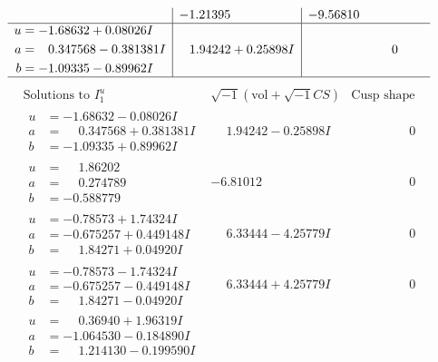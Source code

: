 \documentclass[1p]{elsarticle_modified}
\theoremstyle{definition}
\newcommand{\I}{\sqrt{-1}}
\begin{document}
$$\begin{array}{c|c|c}
 & -1.21395\phantom{ +0.000000I} & -9.56810\phantom{ +0.000000I} \\ \hline\begin{aligned}
u &= -1.68632 + 0.08026 I \\
a &= \phantom{-}0.347568 - 0.381381 I \\
b &= -1.09335 - 0.89962 I\end{aligned}
 & \phantom{-}1.94242 + 0.25898 I & \phantom{-0.000000 } 0\\
 \hline 
 \end{array}$$\newpage$$\begin{array}{c|c|c}  
\text{Solutions to }I^u_{1}& \I (\text{vol} + \sqrt{-1}CS) & \text{Cusp shape}\\
 \hline 
\begin{aligned}
u &= -1.68632 - 0.08026 I \\
a &= \phantom{-}0.347568 + 0.381381 I \\
b &= -1.09335 + 0.89962 I\end{aligned}
 & \phantom{-}1.94242 - 0.25898 I & \phantom{-0.000000 } 0 \\ \hline\begin{aligned}
u &= \phantom{-}1.86202\phantom{ +0.000000I} \\
a &= \phantom{-}0.274789\phantom{ +0.000000I} \\
b &= -0.588779\phantom{ +0.000000I}\end{aligned}
 & -6.81012\phantom{ +0.000000I} & \phantom{-0.000000 } 0 \\ \hline\begin{aligned}
u &= -0.78573 + 1.74324 I \\
a &= -0.675257 + 0.449148 I \\
b &= \phantom{-}1.84271 + 0.04920 I\end{aligned}
 & \phantom{-}6.33444 - 4.25779 I & \phantom{-0.000000 } 0 \\ \hline\begin{aligned}
u &= -0.78573 - 1.74324 I \\
a &= -0.675257 - 0.449148 I \\
b &= \phantom{-}1.84271 - 0.04920 I\end{aligned}
 & \phantom{-}6.33444 + 4.25779 I & \phantom{-0.000000 } 0 \\ \hline\begin{aligned}
u &= \phantom{-}0.36940 + 1.96319 I \\
a &= -1.064530 - 0.184890 I \\
b &= \phantom{-}1.214130 - 0.199590 I\end{aligned}

\end{array}$$
\end{document}
